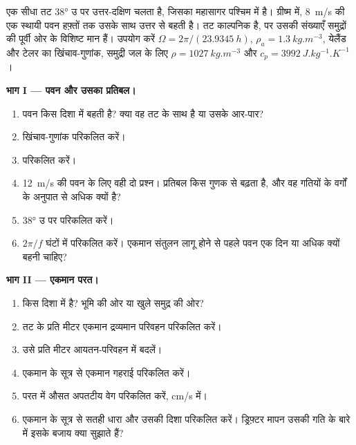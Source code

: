 \begin{problem}
\label{pb:b1:ocean-circulation:1}
एक सीधा तट \ang{38} उ पर उत्तर-दक्षिण चलता है, जिसका महासागर पश्चिम में है। ग्रीष्म में, \qty{8}{m/s} की एक स्थायी पवन हफ़्तों तक उसके साथ उत्तर से बहती है। तट काल्पनिक है, पर उसकी संख्याएँ समुद्रों की पूर्वी ओर के विशिष्ट मान हैं।
उपयोग करें $\Omega = 2\pi/(\qty{23.9345}{h})$, $\rho_a = \qty{1.3}{kg.m^{-3}}$, येलैंड और टेलर का खिंचाव-गुणांक, समुद्री जल के लिए $\rho = \qty{1027}{kg.m^{-3}}$ और $c_p = \qty{3992}{J.kg^{-1}.K^{-1}}$।

\medskip
\noindent\textbf{भाग I --- पवन और उसका प्रतिबल।}
\begin{enumerate}
  \item पवन किस दिशा में बहती है? क्या वह तट के साथ है या उसके आर-पार?
  \item खिंचाव-गुणांक परिकलित करें।
  \item {} परिकलित करें।
  \item \qty{12}{m/s} की पवन के लिए वही दो प्रश्न। प्रतिबल किस गुणक से बढ़ता है, और वह गतियों के वर्गों के अनुपात से अधिक क्यों है?
  \item \ang{38} उ पर  परिकलित करें।
  \item $2\pi/f$ घंटों में परिकलित करें। एकमान संतुलन लागू होने से पहले पवन एक दिन या अधिक क्यों बहनी चाहिए?
\end{enumerate}

\medskip
\noindent\textbf{भाग II --- एकमान परत।}
\begin{enumerate}[resume]
  \item {} किस दिशा में है? भूमि की ओर या खुले समुद्र की ओर?
  \item तट के प्रति मीटर एकमान द्रव्यमान परिवहन परिकलित करें।
  \item उसे प्रति मीटर आयतन-परिवहन में बदलें।
  \item एकमान के सूत्र से एकमान गहराई परिकलित करें।
  \item परत में औसत अपतटीय वेग परिकलित करें, \unit{cm/s} में।
  \item एकमान के सूत्र से सतही धारा और उसकी दिशा परिकलित करें। ड्रिफ़्टर मापन उसकी गति के बारे में इसके बजाय क्या सुझाते हैं?
\end{enumerate}


\end{problem}
